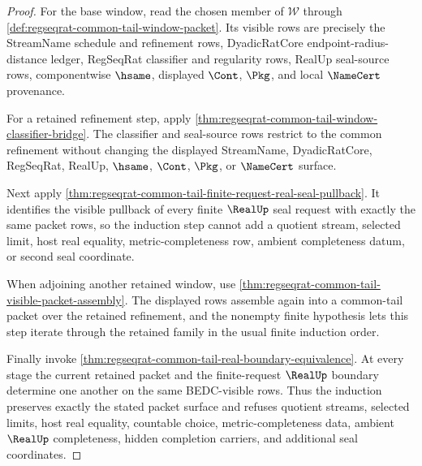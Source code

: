 \begin{proof}
For the base window, read the chosen member of $\mathcal W$ through \autoref{def:regseqrat-common-tail-window-packet}. Its visible rows are precisely the StreamName schedule and refinement rows, DyadicRatCore endpoint-radius-distance ledger, RegSeqRat classifier and regularity rows, RealUp seal-source rows, componentwise $\hsame$, displayed $\Cont$, $\Pkg$, and local $\NameCert$ provenance.

For a retained refinement step, apply \autoref{thm:regseqrat-common-tail-window-classifier-bridge}. The classifier and seal-source rows restrict to the common refinement without changing the displayed StreamName, DyadicRatCore, RegSeqRat, RealUp, $\hsame$, $\Cont$, $\Pkg$, or $\NameCert$ surface.

Next apply \autoref{thm:regseqrat-common-tail-finite-request-real-seal-pullback}. It identifies the visible pullback of every finite $\RealUp$ seal request with exactly the same packet rows, so the induction step cannot add a quotient stream, selected limit, host real equality, metric-completeness row, ambient completeness datum, or second seal coordinate.

When adjoining another retained window, use \autoref{thm:regseqrat-common-tail-visible-packet-assembly}. The displayed rows assemble again into a common-tail packet over the retained refinement, and the nonempty finite hypothesis lets this step iterate through the retained family in the usual finite induction order.

Finally invoke \autoref{thm:regseqrat-common-tail-real-boundary-equivalence}. At every stage the current retained packet and the finite-request $\RealUp$ boundary determine one another on the same BEDC-visible rows. Thus the induction preserves exactly the stated packet surface and refuses quotient streams, selected limits, host real equality, countable choice, metric-completeness data, ambient $\RealUp$ completeness, hidden completion carriers, and additional seal coordinates.
\end{proof}

